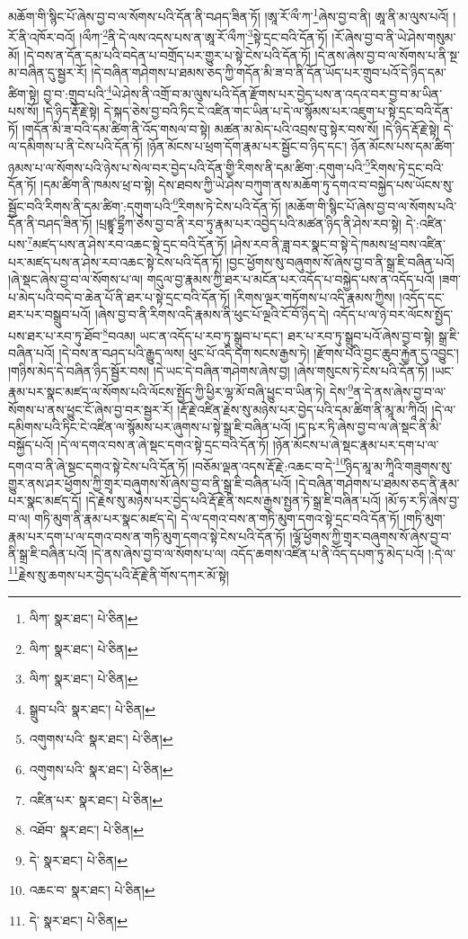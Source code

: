 མཆོག་གི་སྙིང་པོ་ཞེས་བྱ་བ་ལ་སོགས་པའི་དོན་ནི་བཤད་ཟིན་ཏོ། །ཨཱ་རོ་ལྀ་ཀ་\footnote{ལིཀ་  སྣར་ཐང་།  པེ་ཅིན། }ཞེས་བྱ་བ་ནི། ཨཱ་ནི་མ་ལུས་པའོ། །རོ་ནི་འཁོར་བའོ། །ལྀཀ་\footnote{ལིཀ་  སྣར་ཐང་།  པེ་ཅིན། }ནི་དེ་ལས་འདས་པས་ན་ཨཱ་རོ་ལྀཀ་\footnote{ལིཀ་  སྣར་ཐང་།  པེ་ཅིན། }སྟེ་དྲང་བའི་དོན་ཏོ། །རོ་ཞེས་བྱ་བ་ནི་ཡེ་ཤེས་གསུམ་མོ། །དེ་བས་ན་དོན་དམ་པའི་བདེན་པ་བགྲོད་པར་གྱུར་པ་སྟེ་ངེས་པའི་དོན་ཏོ། །དེ་ནས་ཞེས་བྱ་བ་ལ་སོགས་པ་ནི་སྔ་མ་བཞིན་དུ་སྦྱར་རོ། །དེ་བཞིན་གཤེགས་པ་ཐམས་ཅད་ཀྱི་གདོན་མི་ཟ་བ་ནི་དོན་ཡོད་པར་གྲུབ་པའོ་དེ་ཉིད་དམ་ཚིག་སྟེ། བྱ་བ་:གྲུབ་པའི་\footnote{སྒྲུབ་པའི་  སྣར་ཐང་།  པེ་ཅིན། }ཡེ་ཤེས་ནི་འགྲོ་བ་མ་ལུས་པའི་དོན་རྫོགས་པར་བྱེད་པས་ན་འདའ་བར་བྱ་བ་མ་ཡིན་པས་སོ། །དེ་ཉིད་རྡོ་རྗེ་སྟེ། དེ་སྐད་ཅེས་བྱ་བའི་ཏིང་ངེ་འཛིན་གང་ཡིན་པ་དེ་ལ་སྙོམས་པར་འཇུག་པ་སྟེ་དྲང་བའི་དོན་ཏོ། །གདོན་མི་ཟ་བའི་དམ་ཚིག་ནི་འོད་གསལ་བ་སྟེ། མཚན་མ་མེད་པའི་འབྲས་བུ་སྟེར་བས་སོ། །དེ་ཉིད་རྡོ་རྗེ་སྟེ། དེ་ལ་དམིགས་པ་ནི་ངེས་པའི་དོན་ཏོ། །ཉོན་མོངས་པ་ཕྲག་དོག་རྣམ་པར་སྦྱོང་བ་ཉིད་དང་། ཉོན་མོངས་པས་དམ་ཚིག་ཉམས་པ་ལ་སོགས་པའི་ཉེས་པ་སེལ་བར་བྱེད་པའི་དོན་གྱི་རིགས་ནི་དམ་ཚིག་:དགུག་པའི་\footnote{འགུགས་པའི་  སྣར་ཐང་།  པེ་ཅིན། }རིགས་ཏེ་དྲང་བའི་དོན་ཏོ། །དམ་ཚིག་ནི་ཁམས་ཕྲ་བ་སྟེ། དེས་ཐབས་ཀྱི་ཡེ་ཤེས་བཀུག་ནས་མཆོག་ཏུ་དགའ་བ་བསྐྱེད་པས་ཡོངས་སུ་སྦྱོང་བའི་རིགས་ནི་དམ་ཚིག་:དགུག་པའི་\footnote{འགུགས་པའི་  སྣར་ཐང་།  པེ་ཅིན། }རིགས་ཏེ་ངེས་པའི་དོན་ཏོ། །མཆོག་གི་སྙིང་པོ་ཞེས་བྱ་བ་ལ་སོགས་པའི་དོན་ནི་བཤད་ཟིན་ཏོ། །པྲཛྙཱ་དྷྲྀཀ་ཅེས་བྱ་བ་ནི་རབ་ཏུ་རྣམ་པར་འབྱེད་པའི་མཚན་ཉིད་ནི་ཤེས་རབ་སྟེ། དེ་:འཛིན་པས་\footnote{འཛིན་པར་  སྣར་ཐང་།  པེ་ཅིན། }མཛད་པས་ན་ཤེས་རབ་འཆང་སྟེ་དྲང་བའི་དོན་ཏོ། །ཤེས་རབ་ནི་ཟླ་བར་སྣང་བ་སྟེ་དེ་ཁམས་ཕྲ་བས་འཛིན་པར་མཛད་པས་ན་ཤེས་རབ་འཆང་སྟེ་ངེས་པའི་དོན་ཏོ། །བྱང་ཕྱོགས་སུ་བཞུགས་སོ་ཞེས་བྱ་བ་ནི་སྒྲ་ཇི་བཞིན་པའོ། །ཞེ་སྡང་ཞེས་བྱ་བ་ལ་སོགས་པ་ལ། གདུལ་བྱ་རྣམས་ཀྱི་ཐར་པ་མངོན་པར་འདོད་པ་བསྐྱེད་པས་ན་འདོད་པའོ། །ཟག་པ་མེད་པའི་བདེ་བ་ཆེན་པོ་ནི་ཐར་པ་སྟེ་དྲང་བའི་དོན་ཏོ། །རིགས་ལྔར་གཏོགས་པ་འདི་རྣམས་ཀྱིས། །འདོད་དང་ཐར་པར་བསྒྲུབ་པའོ། །ཞེས་བྱ་བ་ནི་རིགས་འདི་རྣམས་ནི་ཕུང་པོ་ལྔའི་ངོ་བོ་ཉིད་དེ། འདོད་པ་ལ་ཉེ་བར་ལོངས་སྤྱོད་པས་ཐར་པ་རབ་ཏུ་ཐོབ་\footnote{འཐོབ་  སྣར་ཐང་།  པེ་ཅིན། }བའམ། ཡང་ན་འདོད་པ་རབ་ཏུ་སྒྲུབ་པ་དང་། ཐར་པ་རབ་ཏུ་སྒྲུབ་པའོ་ཞེས་བྱ་བ་སྟེ། སྒྲ་ཇི་བཞིན་པའོ། །དེ་བས་ན་བཤད་པའི་རྒྱུད་ལས། ཕུང་པོ་འདི་དག་སངས་རྒྱས་ཏེ། །རྫོགས་པའི་བྱང་ཆུབ་རྐྱེན་དུ་འབྱུང་། །གཉིས་མེད་དེ་བཞིན་ཉིད་སྦྱོར་བས། །དེ་ཡང་དེ་བཞིན་གཤེགས་ཞེས་བྱ། །ཞེས་གསུངས་ཏེ་ངེས་པའི་དོན་ཏོ། །ཡང་རྣམ་པར་སྣང་མཛད་ལ་སོགས་པའི་ལོངས་སྤྱོད་ཀྱི་ཕྱིར་ལྷ་མོ་བཞི་ཕྱུང་བ་ཡིན་ཏེ། དེས་\footnote{དེ་  སྣར་ཐང་།  པེ་ཅིན། }ན་དེ་ནས་ཞེས་བྱ་བ་ལ་སོགས་པ་ནས་ཕྱུང་ངོ་ཞེས་བྱ་བར་སྦྱར་རོ། །རྡོ་རྗེ་འཛིན་རྗེས་སུ་མཉེས་པར་བྱེད་པའི་དམ་ཚིག་ནི་མཱ་མ་ཀཱིའོ། །དེ་ལ་དམིགས་པའི་ཏིང་ངེ་འཛིན་ལ་སྙོམས་པར་ཞུགས་པ་སྟེ་སྒྲ་ཇི་བཞིན་པའོ། །དྭ་ཥ་ར་ཏི་ཞེས་བྱ་བ་ལ་ཞེ་སྡང་ནི་མི་བསྐྱོད་པའོ། །དེ་ལ་དགའ་བས་ན་ཞེ་སྡང་དགའ་སྟེ་དྲང་བའི་དོན་ཏོ། །ཉོན་མོངས་པ་ཞེ་སྡང་རྣམ་པར་དག་པ་ལ་དགའ་བ་ནི་ཞེ་སྡང་དགའ་སྟེ་ངེས་པའི་དོན་ཏོ། །བཅོམ་ལྡན་འདས་རྡོ་རྗེ་:འཆང་བ་དེ་\footnote{འཆང་བ་  སྣར་ཐང་།  པེ་ཅིན། }ཉིད་མཱ་མ་ཀཱིའི་གཟུགས་སུ་གྱུར་ནས་ཤར་ཕྱོགས་ཀྱི་གྲྭར་བཞུགས་སོ་ཞེས་བྱ་བ་ནི་སྒྲ་ཇི་བཞིན་པའོ། །དེ་བཞིན་གཤེགས་པ་ཐམས་ཅད་ནི་རྣམ་པར་སྣང་མཛད་དོ། །དེ་རྗེས་སུ་མཉེས་པར་བྱེད་པའི་རྡོ་རྗེ་ནི་སངས་རྒྱས་སྤྱན་ཏེ་སྒྲ་ཇི་བཞིན་པའོ། །མོ་ཧ་ར་ཏི་ཞེས་བྱ་བ་ལ། གཏི་མུག་ནི་རྣམ་པར་སྣང་མཛད་དེ། དེ་ལ་དགའ་བས་ན་གཏི་མུག་དགའ་སྟེ་དྲང་བའི་དོན་ཏོ། །གཏི་མུག་རྣམ་པར་དག་པ་ལ་དགའ་བས་ན་གཏི་མུག་དགའ་སྟེ་ངེས་པའི་དོན་ཏོ། །ལྷོ་ཕྱོགས་ཀྱི་གྲྭར་བཞུགས་སོ་ཞེས་བྱ་བ་ནི་སྒྲ་ཇི་བཞིན་པའོ། །དེ་ནས་ཞེས་བྱ་བ་ལ་སོགས་པ་ལ། འདོད་ཆགས་འཛིན་པ་ནི་འོད་དཔག་ཏུ་མེད་པའོ། །:དེ་ལ་\footnote{དེ་  སྣར་ཐང་།  པེ་ཅིན། }རྗེས་སུ་ཆགས་པར་བྱེད་པའི་རྡོ་རྗེ་ནི་གོས་དཀར་མོ་སྟེ། 